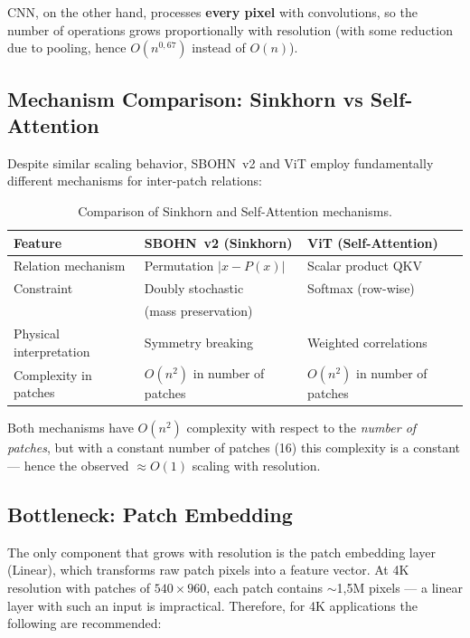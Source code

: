 \documentclass[11pt,a4paper]{report}
\begin{document}
CNN, on the other hand, processes \textbf{every pixel} with convolutions, so the number of operations grows proportionally with resolution (with some reduction due to pooling, hence $O(n^{0{,}67})$ instead of $O(n)$).

\subsection{Mechanism Comparison: Sinkhorn vs Self-Attention}

Despite similar scaling behavior, SBOHN~v2 and ViT employ fundamentally different mechanisms for inter-patch relations:

\begin{table}[htbp]
\centering
\caption{Comparison of Sinkhorn and Self-Attention mechanisms.}
\label{tab:sota_mechanisms}
\begin{tabular}{|l|l|l|}
\hline
\textbf{Feature} & \textbf{SBOHN~v2 (Sinkhorn)} & \textbf{ViT (Self-Attention)} \\
\hline
Relation mechanism & Permutation $|x - P(x)|$ & Scalar product QKV \\
\hline
Constraint & Doubly stochastic & Softmax (row-wise) \\
 & (mass preservation) & \\
\hline
Physical interpretation & Symmetry breaking & Weighted correlations \\
\hline
Complexity in patches & $O(n^2)$ in number of patches & $O(n^2)$ in number of patches \\
\hline
\end{tabular}
\end{table}

Both mechanisms have $O(n^2)$ complexity with respect to the \emph{number of patches}, but with a constant number of patches (16) this complexity is a constant --- hence the observed $\approx O(1)$ scaling with resolution.

\subsection{Bottleneck: Patch Embedding}

The only component that grows with resolution is the patch embedding layer (Linear), which transforms raw patch pixels into a feature vector. At 4K resolution with patches of $540\times960$, each patch contains $\sim$1{,}5M pixels --- a linear layer with such an input is impractical. Therefore, for 4K applications the following are recommended:
\end{document}
